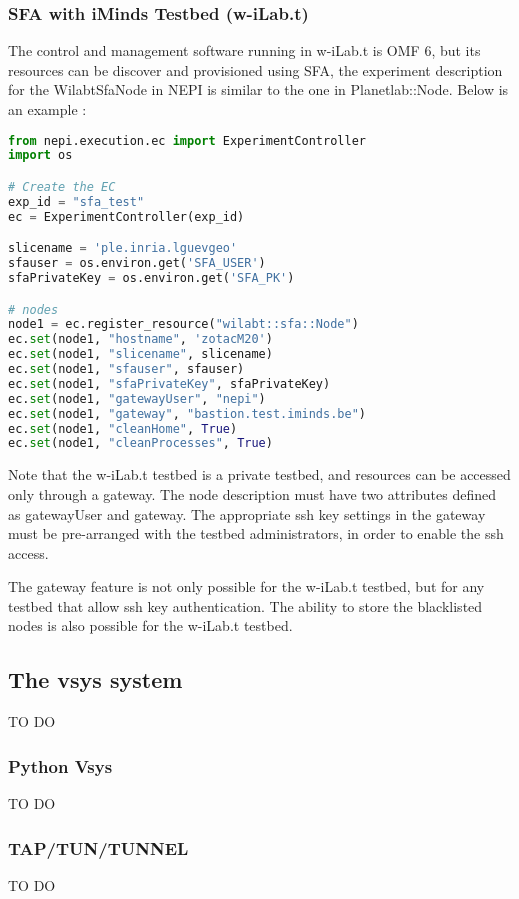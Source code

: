 \subsubsection{SFA with iMinds Testbed (w-iLab.t)}

The control and management software running in w-iLab.t is OMF 6, but its resources can be discover and provisioned using SFA, the experiment description for the WilabtSfaNode in NEPI is similar to the one in Planetlab::Node. Below is an example :
\begin{lstlisting}[language=Python]
from nepi.execution.ec import ExperimentController
import os

# Create the EC
exp_id = "sfa_test"
ec = ExperimentController(exp_id)

slicename = 'ple.inria.lguevgeo'
sfauser = os.environ.get('SFA_USER')
sfaPrivateKey = os.environ.get('SFA_PK')

# nodes
node1 = ec.register_resource("wilabt::sfa::Node")
ec.set(node1, "hostname", 'zotacM20')
ec.set(node1, "slicename", slicename)
ec.set(node1, "sfauser", sfauser)
ec.set(node1, "sfaPrivateKey", sfaPrivateKey)
ec.set(node1, "gatewayUser", "nepi")
ec.set(node1, "gateway", "bastion.test.iminds.be")
ec.set(node1, "cleanHome", True)
ec.set(node1, "cleanProcesses", True)
\end{lstlisting}

Note that the w-iLab.t testbed is a private testbed, and resources can be accessed only through a gateway. The node description must have two attributes defined as gatewayUser and gateway. The appropriate ssh key settings in the gateway must be pre-arranged with the testbed administrators, in order to enable the ssh access.

The gateway feature is not only possible for the w-iLab.t testbed, but for any testbed that allow ssh key authentication. The ability to store the blacklisted nodes is also possible for the w-iLab.t testbed.




\subsection{The vsys system}
    TO DO

  \subsubsection{Python Vsys}
    TO DO

  \subsubsection{TAP/TUN/TUNNEL}
    TO DO


